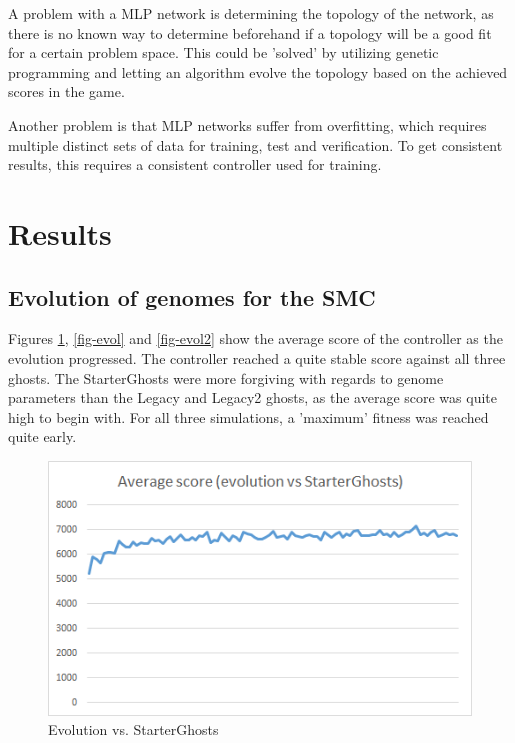 \documentclass[conference]{IEEEtran}
\begin{document}
A problem with a MLP network is determining the topology of the network, as there is no known way to determine beforehand if a topology will be a good fit for a certain problem space. This could be 'solved' by utilizing genetic programming and letting an algorithm evolve the topology based on the achieved scores in the game.

Another problem is that MLP networks suffer from overfitting, which requires multiple distinct sets of data for training, test and verification. To get consistent results, this requires a consistent controller used for training.

\section{Results}

\subsection{Evolution of genomes for the SMC}

Figures \ref{fig-evos}, \ref{fig-evol} and \ref{fig-evol2} show the average score of the controller as the evolution progressed. The controller reached a quite stable score against all three ghosts. The StarterGhosts were more forgiving with regards to genome parameters than the Legacy and Legacy2 ghosts, as the average score was quite high to begin with. For all three simulations, a 'maximum' fitness was reached quite early.

\begin{figure}[htp]
\centerline{\includegraphics[width=0.9\columnwidth]{s_evo.png}}
\caption{Evolution vs. StarterGhosts}
\label{fig-evos}
\end{figure}
\end{document}

